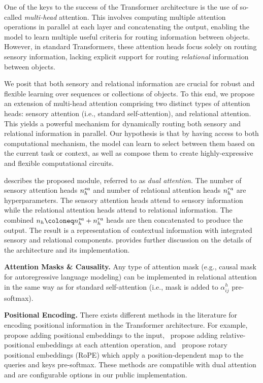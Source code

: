 One of the keys to the success of the Transformer architecture is the use of so-called \textit{multi-head} attention. This involves computing multiple attention operations in parallel at each layer and concatenating the output, enabling the model to learn multiple useful criteria for routing information between objects.  However, in standard Transformers, these attention heads focus solely on routing sensory information, lacking explicit support for routing \textit{relational} information between objects.


We posit that both sensory and relational information are crucial for robust and flexible learning over sequences or collections of objects. To this end, we propose an extension of multi-head attention comprising two distinct types of attention heads: sensory attention (i.e., standard self-attention), and relational attention. This yields a powerful mechanism for dynamically routing both sensory and relational information in parallel. Our hypothesis is that by having access to both computational mechanism, the model can learn to select between them based on the current task or context, as well as compose them to create highly-expressive and flexible computational circuits.

 describes the proposed module, referred to as \textit{dual attention}. The number of sensory attention heads $n_h^{sa}$ and number of relational attention heads $n_h^{ra}$ are hyperparameters. The sensory attention heads attend to sensory information while the relational attention heads attend to relational information. The combined $n_h \coloneq \nhsa + \nhra$ heads are then concatenated to produce the output. The result is a representation of contextual information with integrated sensory and relational components.  provides further discussion on the details of the architecture and its implementation.


\textbf{Attention Masks \& Causality.} Any type of attention mask (e.g., causal mask for autoregressive language modeling) can be implemented in relational attention in the same way as for standard self-attention (i.e., mask is added to $\alpha_{ij}^h$ pre-softmax).

\textbf{Positional Encoding.} There exists different methods in the literature for encoding positional information in the Transformer architecture. For example,~\citep{vaswani2017attention} propose adding positional embeddings to the input,~\citep{shawSelfAttentionRelativePosition2018b} propose adding relative-positional embeddings at each attention operation, and~\citep{suRoFormerEnhancedTransformer2023} propose rotary positional embeddings (RoPE) which apply a position-dependent map to the queries and keys pre-softmax. These methods are compatible with dual attention and are configurable options in our public implementation.

